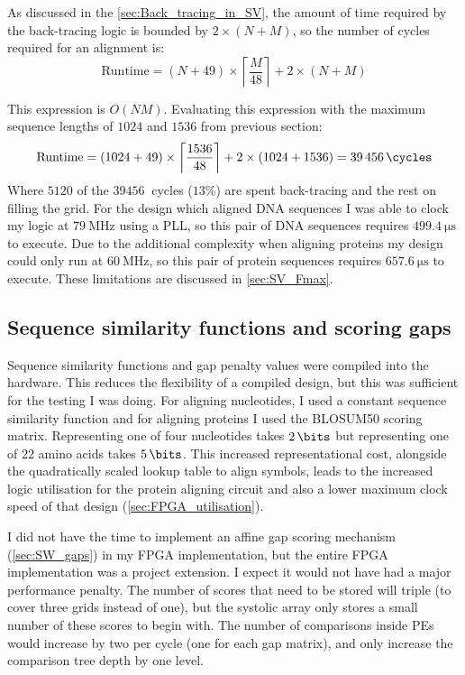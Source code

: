 As discussed in the \cref{sec:Back_tracing_in_SV}, the amount of time required by the back-tracing logic is bounded by $2\times(N+M)$, so the number of cycles required for an alignment is:
$$\text{Runtime} = (N+49) \times \left \lceil \frac{M}{48} \right \rceil + 2 \times (N+M)$$

This expression is $O(NM)$.
Evaluating this expression with the maximum sequence lengths of $1024$ and $1536$ from previous section:
$$\text{Runtime} = (1024+49) \times \left \lceil \frac{1536}{48} \right \rceil + 2 \times (1024+1536) = \SI{39456}{\cycles}$$
Where $5120$ of the $\SI{39456}{}$ cycles ($13\%$) are spent back-tracing and the rest on filling the grid.
For the design which aligned DNA sequences I was able to clock my logic at $\SI{79}{\mega\hertz}$ using a PLL, so this pair of DNA sequences requires $\SI{499.4}{\micro\s}$ to execute.
Due to the additional complexity when aligning proteins my design could only run at $\SI{60}{\mega\hertz}$, so this pair of protein sequences requires $\SI{657.6}{\micro\s}$ to execute.
These limitations are discussed in \cref{sec:SV_Fmax}.

\subsection{Sequence similarity functions and scoring gaps}
\label{sec:Scoring_in_SV_impl}

Sequence similarity functions and gap penalty values were compiled into the hardware.
This reduces the flexibility of a compiled design, but this was sufficient for the testing I was doing.
For aligning nucleotides, I used a constant sequence similarity function and for aligning proteins I used the BLOSUM50 scoring matrix.
Representing one of four nucleotides takes $\SI{2}{\bits}$ but representing one of $22$ amino acids takes $\SI{5}{\bits}$.
This increased representational cost, alongside the quadratically scaled lookup table to align symbols, leads to the increased logic utilisation for the protein aligning circuit and also a lower maximum clock speed of that design (\cref{sec:FPGA_utilisation}).

I did not have the time to implement an affine gap scoring mechanism (\cref{sec:SW_gaps}) in my FPGA implementation, but the entire FPGA implementation was a project extension.
I expect it would not have had a major performance penalty.
The number of scores that need to be stored will triple (to cover three grids instead of one), but the systolic array only stores a small number of these scores to begin with.
The number of comparisons inside PEs would increase by two per cycle (one for each gap matrix), and only increase the comparison tree depth by one level.

